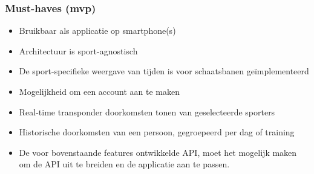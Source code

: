 \subsubsection{Must-haves (\ac{mvp})}

\begin{itemize}
    \item Bruikbaar als applicatie op smartphone(s)
    \item Architectuur is sport-agnostisch
    \item De sport-specifieke weergave van tijden is voor schaatsbanen geïmplementeerd
    \item Mogelijkheid om een account aan te maken
    \item Real-time transponder doorkomsten tonen van geselecteerde sporters
    \item Historische doorkomsten van een persoon, gegroepeerd per dag of training
    \item De voor bovenstaande features ontwikkelde API, moet het mogelijk maken om de API uit te breiden en de applicatie aan te passen.
\end{itemize}

